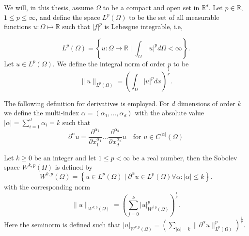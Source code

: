 \documentclass[11pt]{article}
\theoremstyle{remark}
\newcommand{\abs}[1]{\left\lvert #1 \right\rvert}
\renewcommand{\le}{\leqslant}
\renewcommand{\ge}{\geqslant}
\numberwithin{equation}{section}
\begin{document}
We will, in this thesis, assume $\Omega $ to be a compact and open set in $\mathbb{R} ^{d}$. Let $p \in \mathbb{R} $, $ 1 \le  p \le  \infty$, and  define the space $L^{p}\left( \Omega  \right) $ to be the set of all measurable functions $u: \Omega  \mapsto \mathbb{R} $ such that
$\left\lvert f \right\rvert ^{p}$ is Lebesgue integrable, i.e,

\begin{equation*}
    L^{p}\left( \Omega  \right) = \left\{ u: \Omega \mapsto \mathbb{R}  \mid \int_{\Omega }^{} \left\lvert u \right\rvert ^{p} d \Omega  < \infty  \right\}
.\end{equation*}
Let $u \in L^{p}\left( \Omega  \right) $. We define the integral norm of order $p$ to be \[
\| u \|_{ L^{p}\left( \Omega  \right)  }^{  }  = \left( \int_{\Omega }^{} \left\lvert u \right\rvert ^{p} dx  \right) ^{\frac{1}{p}}.
\]

The following definition for derivatives is employed.
For $d$ dimensions of order $k$ we define the multi-index $\alpha  = ( \alpha _{1}, \ldots, \alpha _{d})  $ with the absolute value $\abs{ \alpha  } = \sum_{i=1}^{d}  \alpha _{i} = k $ such that
\begin{equation}
    \label{eq:der}
\partial ^{\alpha} u = \frac{\partial ^{ \alpha_{1}  }  } {\partial^{} x_{1}^{\alpha _{1}}  } \ldots \frac{\partial ^{ \alpha_{d}  }  } {\partial^{} x_{d}^{\alpha _{d}}  } u \quad  \text{for }u \in C^{\left\lvert \alpha  \right\rvert }( \Omega )
\end{equation}

  Let $k\ge 0$ be an integer and let $1 \le  p <  \infty$ be a real number, then the Sobolev space $W^{k,p}( \Omega ) $ is defined by
  \begin{equation}
W^{k,p}\left( \Omega  \right) = \left\{ u \in L^{p}\left( \Omega  \right)  \mid  \partial ^{\alpha } u \in L^{p}\left( \Omega  \right)  \forall \alpha : \left\lvert \alpha  \right\rvert  \le k \right\}.
  \end{equation}
with the corresponding norm
\begin{equation}
\| u \|_{ W^{k,p}\left( \Omega  \right)  }^{  }  = \left(   \sum_{j = 0}^{k}  \left\lvert u \right\rvert ^{p} _{  W^{j,p}\left( \Omega  \right) } \right)^{\frac{1}{p}} .
\end{equation}
Here the seminorm is defined such that $ \left\lvert u \right\rvert _{W^{k,p}( \Omega  ) }^{} =  ( \sum_{\left\lvert \alpha  \right\rvert  = k}^{} \| \partial ^{\alpha }u \|_{ L^{p}( \Omega )   }^{ p } )^{\frac{1}{p}} $.
\end{document}
